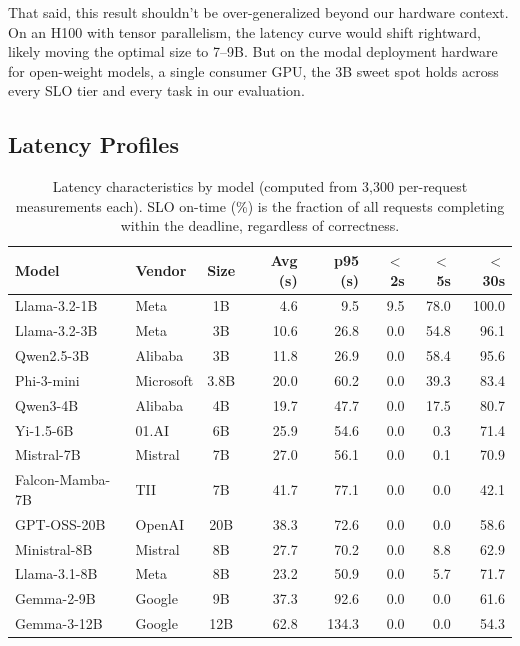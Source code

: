 \documentclass[11pt]{article}
\begin{document}
That said, this result shouldn't be over-generalized beyond our hardware context.  On an H100 with tensor parallelism, the latency curve would shift rightward, likely moving the optimal size to 7--9B.  But on the modal deployment hardware for open-weight models, a single consumer GPU, the 3B sweet spot holds across every SLO tier and every task in our evaluation.

\subsection{Latency Profiles}

\begin{table}[t]
\centering
\caption{Latency characteristics by model (computed from 3{,}300 per-request measurements each).  SLO on-time (\%) is the fraction of all requests completing within the deadline, regardless of correctness.}
\label{tab:latency}
\small
\begin{tabular}{llc rr rrr}
\toprule
\textbf{Model} & \textbf{Vendor} & \textbf{Size} & \textbf{Avg (s)} & \textbf{p95 (s)} & \textbf{$<$2s} & \textbf{$<$5s} & \textbf{$<$30s} \\
\midrule
Llama-3.2-1B     & Meta      & 1B   & 4.6  & 9.5   & 9.5  & 78.0 & 100.0 \\
Llama-3.2-3B     & Meta      & 3B   & 10.6 & 26.8  & 0.0  & 54.8 & 96.1 \\
Qwen2.5-3B       & Alibaba   & 3B   & 11.8 & 26.9  & 0.0  & 58.4 & 95.6 \\
Phi-3-mini        & Microsoft & 3.8B & 20.0 & 60.2  & 0.0  & 39.3 & 83.4 \\
Qwen3-4B          & Alibaba   & 4B   & 19.7 & 47.7  & 0.0  & 17.5 & 80.7 \\
Yi-1.5-6B         & 01.AI     & 6B   & 25.9 & 54.6  & 0.0  & 0.3  & 71.4 \\
Mistral-7B        & Mistral   & 7B   & 27.0 & 56.1  & 0.0  & 0.1  & 70.9 \\
Falcon-Mamba-7B   & TII       & 7B   & 41.7 & 77.1  & 0.0  & 0.0  & 42.1 \\
GPT-OSS-20B       & OpenAI    & 20B  & 38.3 & 72.6  & 0.0  & 0.0  & 58.6 \\
Ministral-8B      & Mistral   & 8B   & 27.7 & 70.2  & 0.0  & 8.8  & 62.9 \\
Llama-3.1-8B      & Meta      & 8B   & 23.2 & 50.9  & 0.0  & 5.7  & 71.7 \\
Gemma-2-9B        & Google    & 9B   & 37.3 & 92.6  & 0.0  & 0.0  & 61.6 \\
Gemma-3-12B       & Google    & 12B  & 62.8 & 134.3 & 0.0  & 0.0  & 54.3 \\
\bottomrule
\end{tabular}
\end{table}
\end{document}
